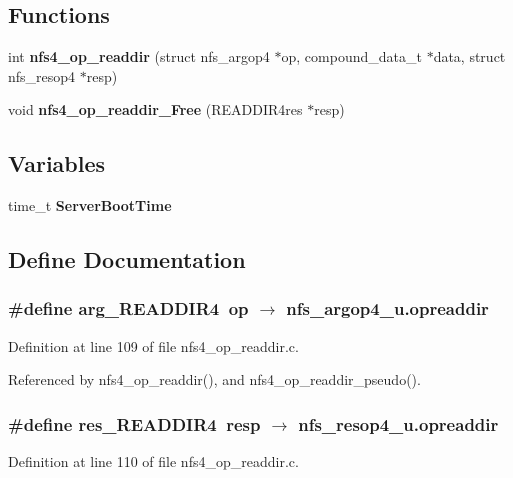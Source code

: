 \subsection*{Functions}
\begin{CompactItemize}
\item 
int {\bf nfs4\_\-op\_\-readdir} (struct nfs\_\-argop4 $\ast$op, compound\_\-data\_\-t $\ast$data, struct nfs\_\-resop4 $\ast$resp)
\item 
void {\bf nfs4\_\-op\_\-readdir\_\-Free} (READDIR4res $\ast$resp)
\end{CompactItemize}
\subsection*{Variables}
\begin{CompactItemize}
\item 
time\_\-t {\bf Server\-Boot\-Time}
\end{CompactItemize}


\subsection{Define Documentation}
\subsubsection{\setlength{\rightskip}{0pt plus 5cm}\#define arg\_\-READDIR4\ op $\rightarrow$ nfs\_\-argop4\_\-u.opreaddir}\label{nfs4__op__readdir_8c_a0}




Definition at line 109 of file nfs4\_\-op\_\-readdir.c.

Referenced by nfs4\_\-op\_\-readdir(), and nfs4\_\-op\_\-readdir\_\-pseudo().
\subsubsection{\setlength{\rightskip}{0pt plus 5cm}\#define res\_\-READDIR4\ resp $\rightarrow$ nfs\_\-resop4\_\-u.opreaddir}\label{nfs4__op__readdir_8c_a1}




Definition at line 110 of file nfs4\_\-op\_\-readdir.c.

